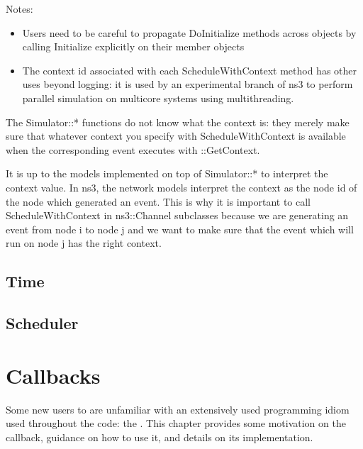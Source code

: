 \documentclass[letterpaper,10pt,english]{sphinxmanual}
\begin{document}
Notes:
\begin{itemize}
\item {} 
Users need to be careful to propagate DoInitialize methods across objects
by calling Initialize explicitly on their member objects

\item {} 
The context id associated with each ScheduleWithContext method has
other uses beyond logging: it is used by an experimental branch of ns\sphinxhyphen{}3
to perform parallel simulation on multicore systems using
multithreading.

\end{itemize}

The Simulator::* functions do not know what the context is: they
merely make sure that whatever context you specify with
ScheduleWithContext is available when the corresponding event executes
with ::GetContext.

It is up to the models implemented on top of Simulator::* to interpret
the context value. In ns\sphinxhyphen{}3, the network models interpret the context
as the node id of the node which generated an event. This is why it is
important to call ScheduleWithContext in ns3::Channel subclasses
because we are generating an event from node i to node j and we want
to make sure that the event which will run on node j has the right
context.


\section{Time}
\label{\detokenize{events:time}}


\section{Scheduler}
\label{\detokenize{events:scheduler}}


\chapter{Callbacks}
\label{\detokenize{callbacks:callbacks}}\label{\detokenize{callbacks::doc}}
Some new users to  are unfamiliar with an extensively used programming
idiom used throughout the code: the . This chapter provides some
motivation on the callback, guidance on how to use it, and details on its
implementation.
\end{document}
